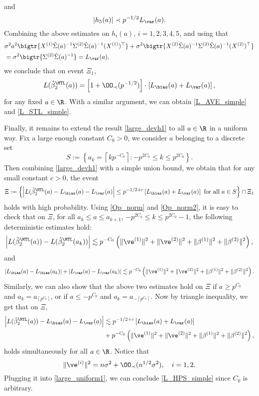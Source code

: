 \documentclass[aos,preprint]{imsart}
\begin{document}
and
$$ \left|h_5(a)   \right| \prec   p^{-1/2}   L_{\var}(a).$$
 Combining the above estimates on $h_i(a)$, $i=1,2,3,4,5$, and using that 
\begin{align*}
& \sigma^2 a^2 \bigtr{X^{(1)} \hat \Sigma(a)^{-1} \Sigma^{(2)} \hat \Sigma(a)^{-1}(X^{(1)})^\top }  + \sigma^2   \bigtr{X^{(2)} \hat \Sigma(a)^{-1} \Sigma^{(2)} \hat \Sigma(a)^{-1}  (X^{(2)})^\top} \\
& =  \sigma^2 \bigtr{ \Sigma^{(2)} \hat \Sigma(a)^{-1}  }=L_{\var}(a),
\end{align*}
 we conclude that on event $\Xi_1$,
 \begin{align}\label{large_devh1}
L(\hat{\beta}_2^{\MTL}(a))  = \left[ 1+ \OO_\prec(p^{-1/2})\right]\cdot \left[L_{\bias} (a) + L_{\var}(a)\right] ,
 \end{align}
 for any fixed $a\in \R$. With a similar argument, we can obtain \eqref{L_AVE_simple} and \eqref{L_STL_simple}.
 
 
 Finally, it remains to extend the result \eqref{large_devh1} to all $a\in \R$ in a uniform way. Fix a large enough constant $C_0>0$, we consider $a$ belonging to a discrete set 
$$ S:=\left\{a_k = \left\lceil kp^{-C_0}\right\rceil: - p^{2C_0}  \le k \le p^{2C_0}\right\}.$$
Then combining \eqref{large_devh1} with a simple union bound, we obtain that for any small constant $c>0$, the event 
$$\Xi:=\left\{ \left|L(\hat{\beta}_2^{\MTL}(a)- L_{\bias} (a) - L_{\var}(a)\right|\le p^{-1/2+c}   \left[ L_{\bias} (a) + L_{\var}(a)\right] \ \text{for all $a\in S$}\right\} \cap \Xi_1$$
holds with high probability.  Using \eqref{Op_norm} and \eqref{Op_norm2}, it is easy to check that on $\Xi$,
for all $a_k \le a\le a_{k+1}$, $- p^{2C_0}  \le k \le p^{2C_0}-1$, the following deterministic estimates hold:
\begin{align*}
\left|L(\hat{\beta}_2^{\MTL}(a))-L(\hat{\beta}_2^{\MTL}(a_k))\right|   \lesssim p^{-C_0} \left( \|\ve^{(1)} \|^2  +  \|\ve^{(2)}\|^2 +\|\beta^{(1)} \|^2  +  \|\beta^{(2)} \|^2\right)  ,
\end{align*}
and 
\begin{align*}
 \left|L_{\bias}(a)-L_{\bias}(a_k)\right|  + \left|L_{\var}(a)-L_{\var}(a_k)\right|  \lesssim p^{-C_0} \left( \|\ve^{(1)} \|^2  +  \|\ve^{(2)}\|^2 +\|\beta^{(1)} \|^2  +  \|\beta^{(2)} \|^2\right)  .
\end{align*}
Similarly, we can also show that the above two estimates hold on $\Xi$ if $a\ge p^{C_0}$ and $a_k=a_{\left\lceil p^{C_0}\right\rceil}$, or if $a\le -p^{C_0}$ and $a_k=a_{-\left\lceil p^{C_0}\right\rceil}$. Now by triangle inequality, we get that on $\Xi$,
\begin{align}
\left|L(\hat{\beta}_2^{\MTL}(a))- L_{\bias} (a) - L_{\var}(a)\right| &\lesssim p^{-1/2+c}   \left[ L_{\bias} (a) + L_{\var}(a)\right]\nonumber \\
& + p^{-C_0} \left( \|\ve^{(1)} \|^2  +  \|\ve^{(2)}\|^2 +\|\beta^{(1)} \|^2  +  \|\beta^{(2)} \|^2\right) ,\label{large_uniform1}
\end{align}
holds simultaneously for all $a\in \R$. Notice that 
$$\|\ve^{(i)} \|^2   =n\sigma^2 + \OO_\prec(n^{1/2}\sigma^2) ,\quad i=1,2.$$
Plugging it into \eqref{large_uniform1}, we can conclude \eqref{L_HPS_simple} since $C_0$ is arbitrary. 
\end{document}
